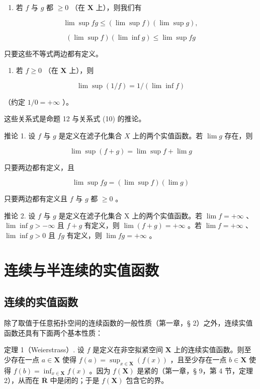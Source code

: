 \begin{enumerate}
\def\labelenumi{(\roman{enumi})}
\setcounter{enumi}{1}
\tightlist
\item
  若 \(f\) 与 \(g\) 都 \(\geqslant 0\) （在 \(\mathbf{X}\) 上），则我们有
\end{enumerate}

\[
\lim \sup f g \leqslant (\lim \sup f) (\lim \sup g), \tag {30}
\]

\[
(\lim \sup f) (\lim \inf g) \leqslant \lim \sup f g \tag {31}
\]

只要这些不等式两边都有定义。

\begin{enumerate}
\def\labelenumi{(\roman{enumi})}
\setcounter{enumi}{2}
\tightlist
\item
  若 \(f \geqslant 0\) （在 \(\mathbf{X}\) 上），则
\end{enumerate}

\[
\lim \sup (1 / f) = 1 / (\lim \inf f)\tag{32}
\]

（约定 \(1 / 0 = +\infty\) ）。

这些关系式是命题 12 与关系式 (10) 的推论。

推论 1. 设 \(f\) 与 \(g\) 是定义在滤子化集合 \(X\) 上的两个实值函数。若 \(\lim g\) 存在，则

\[
\lim \sup (f + g) = \lim \sup f + \lim g \tag {33}
\]

只要两边都有定义，且

\[
\lim \sup f g = (\lim \sup f) (\lim g) \tag {34}
\]

只要两边都有定义且 \(f\) 与 \(g\) 都 \(\geqslant 0\) 。

推论 2. 设 \(f\) 与 \(g\) 是定义在滤子化集合 X 上的两个实值函数。若 \(\lim f = +\infty\) 、\(\lim \inf g > -\infty\) 且 \(f + g\) 有定义，则 \(\lim (f + g) = +\infty\) 。若 \(\lim f = +\infty\) 、\(\lim \inf g > 0\) 且 \(fg\) 有定义，则 \(\lim fg = +\infty\) 。

\section{连续与半连续的实值函数}

\subsection{连续的实值函数}

除了取值于任意拓扑空间的连续函数的一般性质（第一章，§ 2）之外，连续实值函数还具有下面两个基本性质：

定理 1（Weierstrass）. 设 \(f\) 是定义在非空拟紧空间 \(\mathbf{X}\) 上的连续实值函数。则至少存在一点 \(a \in \mathbf{X}\) 使得 \(f(a) = \sup_{x \in \mathbf{X}} (f(x))\) ，且至少存在一点 \(b \in \mathbf{X}\) 使得 \(f(b) = \inf_{x \in \mathbf{X}} f(x)\) 。因为 \(f(\mathbf{X})\) 是紧的（第一章，§ 9，第 4 节，定理 2），从而在 \(\overline{\mathbf{R}}\) 中是闭的；于是 \(f(\mathbf{X})\) 包含它的界。

